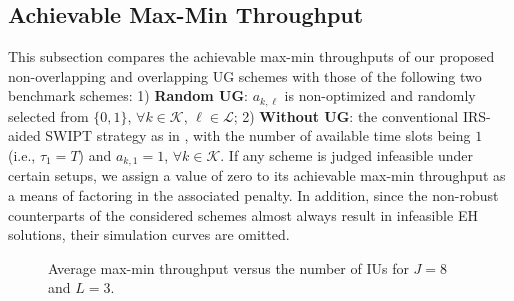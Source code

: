 \documentclass[12pt,draftclsnofoot, onecolumn]{IEEEtran}
\theoremstyle{plain}
\begin{document}
\begin{sloppypar}
\vspace{-1mm}
\subsection{Achievable Max-Min Throughput}
This subsection compares the achievable max-min throughputs of our proposed non-overlapping and overlapping UG schemes with those of the following two benchmark schemes: 1) \textbf{Random UG}: $a_{k,\ell}$ is non-optimized and randomly selected from $\{0,1\}$, $\forall k\in\mathcal K$, $\ell\in\mathcal L$;  
2) \textbf{Without UG}: the conventional IRS-aided SWIPT strategy as in \cite{2020_Qingqing_SWIPT_letter,2020_Qingqing_SWIPT_QoS,2020_Cunhua_SWIPT,2020_Wei_SWIPT_secure,2021_Shayan_SWIPT}, with the number of available time slots being $1$ (i.e., $\tau_1 = T$) and $a_{k,1} = 1$, $\forall k\in\mathcal K$. If any scheme is judged infeasible under certain setups, we assign a value of zero to its achievable max-min throughput as a means of factoring in the associated penalty. In addition, since the non-robust counterparts of the considered schemes almost always result in infeasible EH solutions, their simulation curves are omitted. 

\begin{figure}[!t]
	\vspace{-3mm}
	\hspace{-4.5mm}
	\hspace{-8.5mm}
	\vspace{-1.4mm}
	\caption{Average max-min throughput versus the number of IUs for $J = 8$ and $L = 3$.}
	\label{fig:R_vs_IUs}
	\vspace{-4mm}
\end{figure}


\end{sloppypar}
\end{document}
